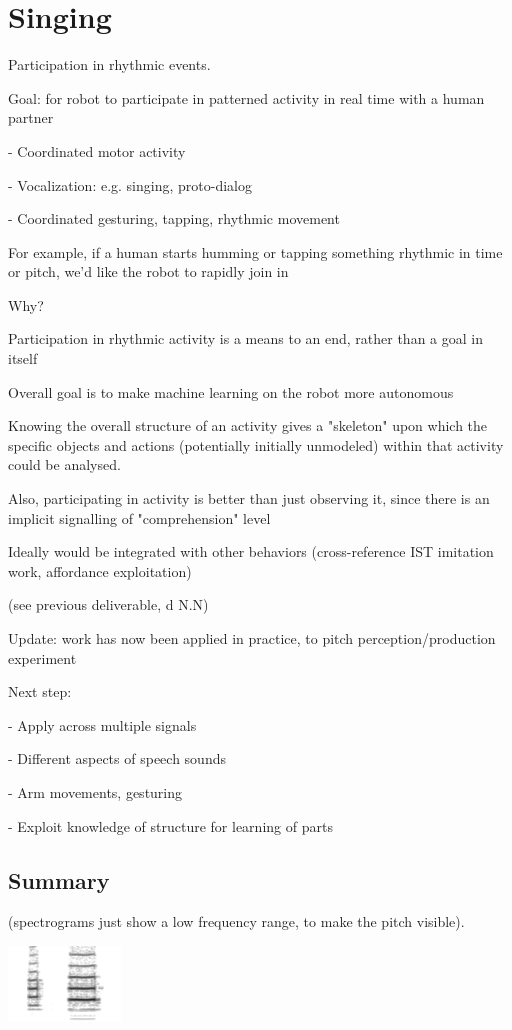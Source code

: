 
\section{Singing}

Participation in rhythmic events.

Goal: for robot to participate in patterned activity in real time with a human partner

- Coordinated motor activity

- Vocalization: e.g. singing, proto-dialog

- Coordinated gesturing, tapping, rhythmic movement

For example, if a human starts humming or tapping something rhythmic in time or pitch, we'd like the robot to rapidly join in


Why?

Participation in rhythmic activity is a means to an end, rather than a goal in itself

Overall goal is to make machine learning on the robot more autonomous

Knowing the overall structure of an activity gives a "skeleton" upon which the specific objects and actions (potentially initially unmodeled) within that activity could be analysed.

Also, participating in activity is better than just observing it, since there is an implicit signalling of "comprehension" level

Ideally would be integrated with other behaviors (cross-reference IST imitation work, affordance exploitation)


(see previous deliverable, d N.N)

Update: work has now been applied in practice, to pitch perception/production experiment

Next step: 

- Apply across multiple signals

- Different aspects of speech sounds

- Arm movements, gesturing

- Exploit knowledge of structure for learning of parts


\subsection{Summary}

(spectrograms just show a low frequency range, to make the pitch visible).

\includegraphics[height=2cm]{images/chico-output-separate-high-low}

